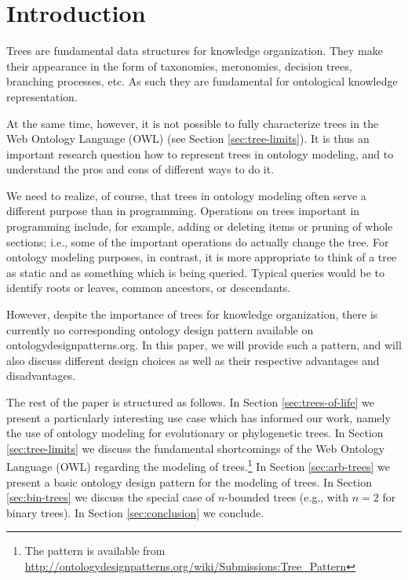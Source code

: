 \section{Introduction}\label{sec:intro}


Trees are fundamental data structures for knowledge organization. They make their appearance in the form of taxonomies, meronomies, decision trees, branching processes, etc. As such they are fundamental for ontological knowledge representation. 

At the same time, however, it is not possible to fully characterize trees in the Web Ontology Language (OWL) \cite{owl2-primer,FOST} (see Section \ref{sec:tree-limits}). It is thus an important research question how to represent trees in ontology modeling, and to understand the pros and cons of different ways to do it. 

We need to realize, of course, that trees in ontology modeling often serve a different purpose than in programming. Operations on trees important in programming include, for example, adding or deleting items or pruning of whole sections; i.e., some of the important operations do actually change the tree. For ontology modeling purposes, in contrast, it is more appropriate to think of a tree as static and as something which is being queried. Typical queries would be to identify roots or leaves, common ancestors, or descendants. 

However, despite the importance of trees for knowledge organization, there is currently no corresponding ontology design pattern available on ontologydesignpatterns.org. In this paper, we will provide such a pattern, and will also discuss different design choices as well as their respective advantages and disadvantages. 

The rest of the paper is structured as follows. In Section \ref{sec:trees-of-life} we present a particularly interesting use case which has informed our work, namely the use of ontology modeling for evolutionary or phylogenetic trees. In Section \ref{sec:tree-limits} we  discuss the fundamental shortcomings of the Web Ontology Language (OWL) regarding the modeling of trees.\footnote{The pattern is available from \url{http://ontologydesignpatterns.org/wiki/Submissions:Tree_Pattern}} In Section \ref{sec:arb-trees} we present a basic ontology design pattern for the modeling of trees. In Section \ref{sec:bin-trees} we discuss the special case of $n$-bounded trees (e.g., with $n = 2$ for binary trees). In Section \ref{sec:conclusion} we conclude. 
